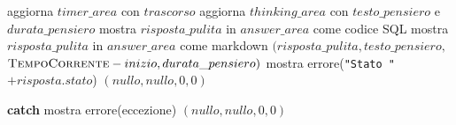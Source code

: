 \documentclass[10pt,a4paper]{article}
\newcommand{\Catch}{\State \textbf{catch}}
\begin{document}
\begin{algorithm}[H]
\begin{algorithmic}[1]
                        \State aggiorna $timer\_area$ con $trascorso$
                    \EndIf
                        \State aggiorna $thinking\_area$ con $testo\_pensiero$ e $durata\_pensiero$
                    \EndIf
                            \State mostra $risposta\_pulita$ in $answer\_area$ come codice SQL
                        \Else
                            \State mostra $risposta\_pulita$ in $answer\_area$ come markdown
                        \EndIf
                    \EndIf
                \EndIf
            \EndFor
            \State \Return $(risposta\_pulita, testo\_pensiero,$
            \State \hspace{1.5em} $\Call{TempoCorrente}{} - inizio, durata\_pensiero)$
        \Else
            \State mostra errore(\texttt{"Stato "} $+ risposta.stato$)
            \State \Return $(nullo, nullo, 0, 0)$
        \EndIf

        \Catch
        \State \hspace{1.5em} mostra errore(eccezione)
        \State \hspace{1.5em} \Return $(nullo, nullo, 0, 0)$

    \EndProcedure
    \end{algorithmic}
    \end{algorithm}
\end{document}

